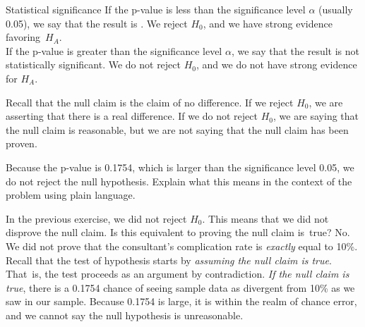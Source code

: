 \begin{onebox}{Statistical significance}
If the p-value is less than the significance level $\alpha$ (usually 0.05), we say that the result is . We reject $H_0$, and we have strong evidence favoring~$H_A$. \\[2mm]
If the p-value is greater than the significance level $\alpha$, we say that the result is not statistically significant. We do not reject $H_0$, and we do not have strong evidence for $H_A$.\end{onebox}

Recall that the null claim is the claim of no difference. If we reject $H_0$, we are asserting that there is a real difference. If we do not reject $H_0$, we are saying that the null claim is reasonable, but we are not saying that the null claim has been proven.

\begin{exercisewrap}
\begin{nexercise} \label{plainLanguageExplanationOfHTConclusionForLiverDonorSurgicalConsultant}
Because the p-value is 0.1754, which is larger than the significance level 0.05, we do not reject the null hypothesis. Explain what this means in the context of the problem using plain language.\footnotemark
\end{nexercise}
\end{exercisewrap}

\D{\newpage}

\begin{examplewrap}
\begin{nexample}{In the previous exercise, we did not reject $H_0$. This means that we did not disprove the null claim. Is this equivalent to proving the null claim is~true?}
No. We did not prove that the consultant's complication rate is \emph{exactly} equal to 10\%. Recall that the test of hypothesis starts by \emph{assuming the null claim is true}. That~is, the test proceeds as an argument by contradiction. \emph{If the null claim is true}, there is a 0.1754 chance of seeing sample data as divergent from 10\% as we saw in our sample. Because 0.1754 is large, it is within the realm of chance error, and we cannot say the null hypothesis is unreasonable.\footnotemark
\end{nexample}
\end{examplewrap}


